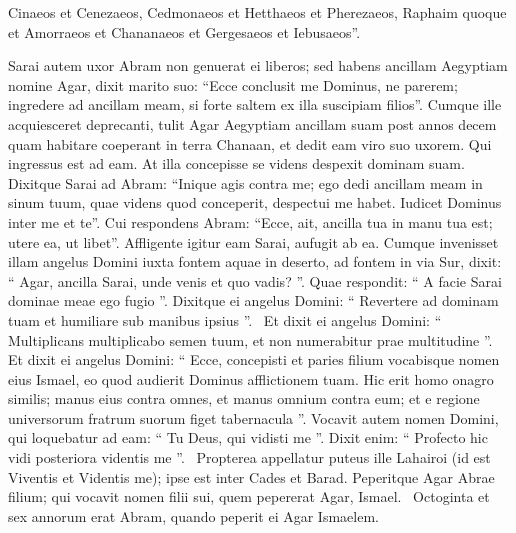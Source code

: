 \begin{biblechapter}
\begin{biblechapter}
\begin{biblechapter}
\begin{biblechapter}
\begin{biblechapter}
\begin{biblechapter}
\begin{biblechapter}
\begin{biblechapter}
\begin{biblechapter}
\begin{biblechapter}
\begin{biblechapter}
\begin{biblechapter}
\begin{biblechapter}
\begin{biblechapter}
\begin{biblechapter}
\verse Cinaeos et Cenezaeos, Cedmonaeos 
\verse et Hetthaeos et Pherezaeos, Raphaim quoque 
\verse et Amorraeos et Chananaeos et Gergesaeos et Iebusaeos”.
 
\begin{biblechapter}
\verse Sarai autem uxor Abram non genuerat ei liberos; sed habens ancillam Aegyptiam nomine Agar, 
\verse dixit marito suo: “Ecce conclusit me Dominus, ne parerem; ingredere ad ancillam meam, si forte saltem ex illa suscipiam filios”. Cumque ille acquiesceret deprecanti, 
\verse tulit Agar Aegyptiam ancillam suam post annos decem quam habitare coeperant in terra Chanaan, et dedit eam viro suo uxorem. 
\verse Qui ingressus est ad eam. At illa concepisse se videns despexit dominam suam.
 \verse Dixitque Sarai ad Abram: “Inique agis contra me; ego dedi ancillam meam in sinum tuum, quae videns quod conceperit, despectui me habet. Iudicet Dominus inter me et te”. 
\verse Cui respondens Abram: “Ecce, ait, ancilla tua in manu tua est; utere ea, ut libet”. Affligente igitur eam Sarai, aufugit ab ea. 
\verse Cumque invenisset illam angelus Domini iuxta fontem aquae in deserto, ad fontem in via Sur, 
\verse dixit: “ Agar, ancilla Sarai, unde venis et quo vadis? ”. Quae respondit: “ A facie Sarai dominae meae ego fugio ”. 
\verse Dixitque ei angelus Domini: “ Revertere ad dominam tuam et humiliare sub manibus ipsius ”. 
 \verse Et dixit ei angelus Domini: “ Multiplicans multiplicabo semen tuum, et non numerabitur prae multitudine ”. 
 \verse Et dixit ei angelus Domini:
 “ Ecce, concepisti et paries filium
 vocabisque nomen eius Ismael,
 eo quod audierit Dominus afflictionem tuam.
 \verse Hic erit homo onagro similis;
 manus eius contra omnes,
 et manus omnium contra eum;
 et e regione universorum fratrum suorum figet tabernacula ”.
 \verse Vocavit autem nomen Domini, qui loquebatur ad eam: “ Tu Deus, qui vidisti me ”. Dixit enim: “ Profecto hic vidi posteriora videntis me ”. 
 \verse Propterea appellatur puteus ille Lahairoi (id est Viventis et Videntis me); ipse est inter Cades et Barad.
 \verse Peperitque Agar Abrae filium; qui vocavit nomen filii sui, quem pepererat Agar, Ismael. 
 \verse Octoginta et sex annorum erat Abram, quando peperit ei Agar Ismaelem.
 

\end{biblechapter}
\end{biblechapter}
\end{biblechapter}
\end{biblechapter}
\end{biblechapter}
\end{biblechapter}
\end{biblechapter}
\end{biblechapter}
\end{biblechapter}
\end{biblechapter}
\end{biblechapter}
\end{biblechapter}
\end{biblechapter}
\end{biblechapter}
\end{biblechapter}
\end{biblechapter}
